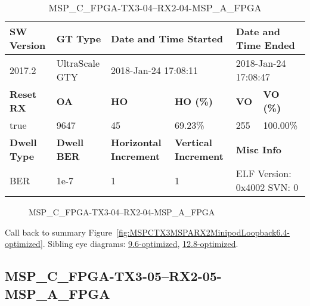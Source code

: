 \begin{table}[h]
\centering
\caption{MSP\_C\_FPGA-TX3-04--RX2-04-MSP\_A\_FPGA}
\label{tab:MSPCFPGATX304RX204MSPAFPGA6.4-optimized}
\begin{tabular}{@{}|l|l|l|l|l|l|@{}}
\toprule
\textbf{SW Version}                & \textbf{GT Type}   & \multicolumn{2}{l|}{\textbf{Date and Time Started}}            & \multicolumn{2}{l|}{\textbf{Date and Time Ended}}        \\ \midrule
2017.2                       & UltraScale GTY          & \multicolumn{2}{l|}{2018-Jan-24 17:08:11}                   & \multicolumn{2}{l|}{2018-Jan-24 17:08:47}               \\ \midrule
\textbf{Reset RX}                  & \textbf{OA} & \textbf{HO}   & \textbf{HO (\%)} & \textbf{VO} & \textbf{VO (\%)} \\ \midrule
true & 9647        & 45          & 69.23\%        & 255        & 100.00\%       \\ \midrule
\textbf{Dwell Type}                & \textbf{Dwell BER} & \textbf{Horizontal Increment} & \textbf{Vertical Increment}    & \multicolumn{2}{l|}{\textbf{Misc Info}}                  \\ \midrule
BER                            & 1e-7        & 1        & 1           & \multicolumn{2}{l|}{ELF Version: 0x4002 SVN: 0}                         \\ \bottomrule
\end{tabular}
\end{table}

\begin{figure}[h]
\caption{MSP\_C\_FPGA-TX3-04--RX2-04-MSP\_A\_FPGA} \label{fig:MSPCFPGATX304RX204MSPAFPGA6.4-optimized}
\end{figure}

Call back to summary Figure~\ref{fig:MSPCTX3MSPARX2MinipodLoopback6.4-optimized}.
Sibling eye diagrams: \hyperref[sec:MSPCFPGATX304RX204MSPAFPGA9.6-optimized]{9.6-optimized}, \hyperref[sec:MSPCFPGATX304RX204MSPAFPGA12.8-optimized]{12.8-optimized}.

\clearpage
\newpage


\subsection{MSP\_C\_FPGA-TX3-05--RX2-05-MSP\_A\_FPGA}\label{sec:MSPCFPGATX305RX205MSPAFPGA6.4-optimized}

